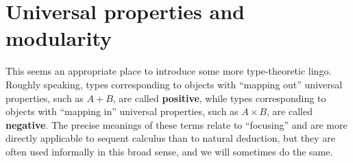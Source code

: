 \section{Universal properties and modularity}
\label{sec:modularity}

This seems an appropriate place to introduce some more type-theoretic lingo.
Roughly speaking, types corresponding to objects with ``mapping out'' universal properties, such as $A+B$, are called \textbf{positive}, while types corresponding to objects with ``mapping in'' universal properties, such as $A\times B$, are called \textbf{negative}.
The precise meanings of these terms relate to ``focusing'' and are more directly applicable to sequent calculus than to natural deduction, but they are often used informally in this broad sense, and we will sometimes do the same.

